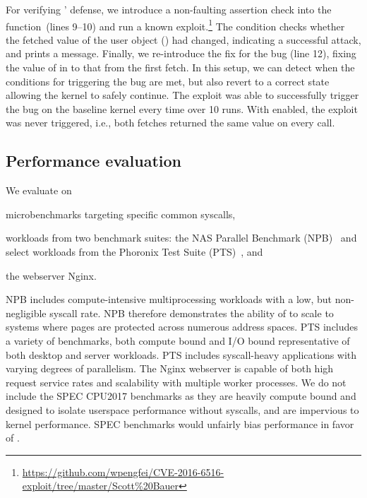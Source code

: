 For verifying \midas' defense, we introduce a non-faulting assertion
check into the function~(lines 9--10) and run a known
exploit.\footnote{\url{https://github.com/wpengfei/CVE-2016-6516-exploit/tree/master/Scott\%20Bauer}}
The condition checks whether the fetched value of the user object ()
had changed, indicating a successful attack, and prints a message.
Finally, we re-introduce the fix for the bug (line 12), fixing the value of
 in  to that from the first fetch.
In this setup, we can detect when the conditions for triggering the bug are met,
but also revert to a correct state allowing the kernel to safely
continue.
The exploit was able to successfully trigger the bug on the baseline kernel
every time over 10 runs.
With \midas enabled, the exploit was never triggered, i.e., both fetches
returned the same value on every call.\\


\subsection{Performance evaluation}
\label{sec:midas:perf}

We evaluate \midas on
\begin{inparaenum}
\item microbenchmarks targeting specific common syscalls,
\item workloads from two benchmark suites: the NAS Parallel
    Benchmark (NPB)~\cite{npb} and select workloads
    from the Phoronix Test Suite (PTS)~\cite{pts}, and
\item the webserver Nginx.
\end{inparaenum}
NPB includes compute-intensive multiprocessing workloads with a
low, but non-negligible syscall rate.
NPB therefore demonstrates the ability of \midas to
scale to systems where pages are protected across numerous
address spaces.
PTS includes a variety of benchmarks, both compute bound and
I/O bound representative of both desktop and server workloads.
PTS includes syscall-heavy applications with varying degrees
of parallelism.
The Nginx webserver is capable of both high request service rates
and scalability with multiple worker processes.
We do not include the SPEC CPU2017 benchmarks
as they are heavily compute bound and designed to isolate userspace
performance without syscalls, and are impervious to kernel performance.
SPEC benchmarks would unfairly bias performance in favor of
\midas.

